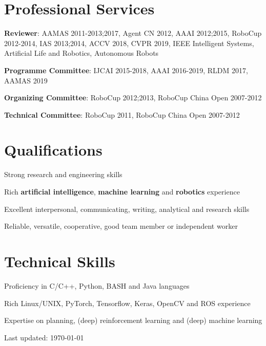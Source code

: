 \documentclass[letterpaper,10pt]{article}
\def\footerlink{}
\renewenvironment{itemize}{
  \begin{list}{}{
    \setlength{\leftmargin}{1.5em}
  }
}{
  \end{list}
}
\begin{document}
\vspace{10pt}
\section*{Professional Services}
\begin{itemize}
	\item \textbf{Reviewer}: AAMAS 2011-2013;2017, Agent CN 2012, AAAI 2012;2015, RoboCup 2012-2014, IAS 2013;2014, ACCV 2018, CVPR 2019, IEEE Intelligent Systems, Artificial Life and Robotics, Autonomous Robots
	\item \textbf{Programme Committee}: IJCAI 2015-2018, AAAI 2016-2019, RLDM 2017, AAMAS 2019
	\item \textbf{Organizing Committee}: RoboCup 2012;2013, RoboCup China Open 2007-2012
	\item \textbf{Technical Committee}: RoboCup 2011, RoboCup China Open 2007-2012
\end{itemize}

\vspace{10pt}
\section*{Qualifications}
\begin{itemize}
	\item Strong research and engineering skills
	\item Rich \textbf{artificial intelligence}, \textbf{machine learning} and \textbf{robotics} experience
	\item Excellent interpersonal, communicating, writing, analytical and research skills
	\item Reliable, versatile, cooperative, good team member or independent worker
\end{itemize}

\vspace{10pt}
\section*{Technical Skills}
\begin{itemize}
	\item Proficiency in C/C++, Python, BASH and Java languages
	\item Rich Linux/UNIX, PyTorch, Tensorflow, Keras, OpenCV and ROS experience
	\item Expertise on planning, (deep) reinforcement learning and (deep) machine learning
\end{itemize}

\bigskip

\begin{center}
  \begin{footnotesize}
    Last updated: \today \\
    \href{\footerlink}{\texttt{\footerlink}}
  \end{footnotesize}
\end{center}
\end{document}
